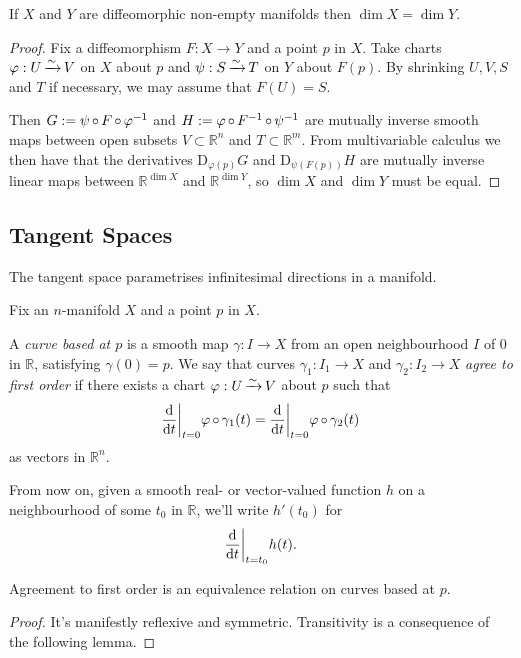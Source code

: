 \documentclass[a4paper,11pt]{article}
\begin{document}
	\begin{lem}
		If $X$ and $Y$ are diffeomorphic non-empty manifolds then $\dim X = \dim Y$.
	\end{lem}
	\begin{proof}
		Fix a diffeomorphism $F : X \to Y$ and a point $p$ in $X$. Take charts $\varphi : U \operatorname{\xrightarrow{\sim}} V$ on $X$ about $p$ and $\psi : S \operatorname{\xrightarrow{\sim}} T$ on $Y$ about $F(p)$. By shrinking $U,V,S$ and $T$ if necessary, we may assume that $F(U)=S$.
		
		Then $G: = \psi \operatorname{\circ} F \operatorname{\circ} \varphi^{-1}$ and $H := \varphi \operatorname{\circ} F^{-1} \operatorname{\circ} \psi^{-1}$ are mutually inverse smooth maps between open subsets $V \subset \mathbb{R}^n$ and $T \subset \mathbb{R}^m$. From multivariable calculus we then have that the derivatives $\mathrm{D}_{\varphi(p)}G$ and $\mathrm{D}_{\psi(F(p))} H$ are mutually inverse linear maps between $\mathbb{R}^{\dim X}$ and $\mathbb{R}^{\dim Y}$, so $\dim X$ and $\dim Y$ must be equal.
	\end{proof}

	\subsection{Tangent Spaces} 
	
	The tangent space parametrises infinitesimal directions in a manifold.

	Fix an $n$-manifold $X$ and a point $p$ in $X$.

	\begin{defi}
		A \emph{curve based at $p$} is a smooth map $\gamma : I \to X$ from an open neighbourhood $I$ of $0$ in $\mathbb{R}$, satisfying $\gamma(0) = p$. We say that curves $\gamma_1 : I_1 \to X$ and $\gamma_2 : I_2 \to X$ \emph{agree to first order} if there exists a chart $\varphi : U \operatorname{\xrightarrow{\sim}} V$ about $p$ such that 
		\[
			\dv{t}\bigg|_{t=0} \varphi \operatorname{\circ} \gamma_1(t) = \dv{t}\bigg|_{t=0} \varphi \operatorname{\circ} \gamma_2 (t)
		\]
		as vectors in $\mathbb{R}^n$.
	\end{defi}

	From now on, given a smooth real- or vector-valued function $h$ on a neighbourhood of some $t_0$ in $\mathbb{R}$, we'll write $h'(t_0)$ for
	\[
		\dv{t}\bigg|_{t = t_0} h(t).
	\]
	
	\begin{prop}
		Agreement to first order is an equivalence relation on curves based at $p$.
	\end{prop}

	\begin{proof}
		It's manifestly reflexive and symmetric. Transitivity is a consequence of the following lemma.
	\end{proof}
\end{document}
